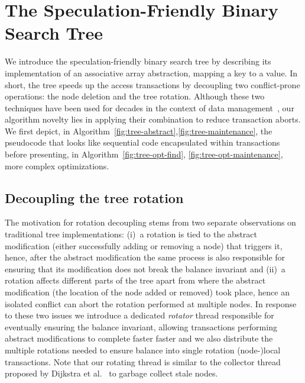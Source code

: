 %






\section{The Speculation-Friendly Binary Search Tree}\label{sec:tf}

We introduce the speculation-friendly binary search tree by describing its implementation of an associative array abstraction, mapping a key to 
a value. In short, the tree speeds up the access transactions by decoupling two conflict-prone operations: the node deletion and the tree rotation. 
Although these two techniques have been used for decades in the context of data management~\cite{DLM78,Moh90}, our algorithm novelty lies in applying 
their combination to reduce transaction aborts. We first depict, in Algorithm~\ref{fig:tree-abstract},\ref{fig:tree-maintenance}, the pseudocode that looks like sequential code encapsulated 
within transactions before presenting, in Algorithm~\ref{fig:tree-opt-find}, \ref{fig:tree-opt-maintenance}, more complex optimizations.

\subsection{Decoupling the tree rotation}
The motivation for rotation decoupling stems from two separate observations on traditional tree implementations: (i)~a rotation is tied to the abstract modification
(either successfully adding or removing a node) that triggers it, hence, after the abstract modification the same process
is also responsible for ensuring that its modification does not break the balance invariant and (ii)~a rotation affects different 
parts of the tree apart from where the abstract modification (the location of the node added or removed) took place, hence an isolated conflict can abort the rotation performed at multiple nodes.
In response to these two issues we introduce a dedicated \emph{rotator} thread responsible for eventually ensuring the balance invariant,
allowing transactions performing abstract modifications to complete faster faster and we also distribute the multiple rotations needed to ensure balance 
into single rotation (node-)local transactions. 
Note that our rotating thread is similar to the collector 
thread proposed by Dijkstra et al.~\cite{DLM78} to garbage collect stale nodes.

